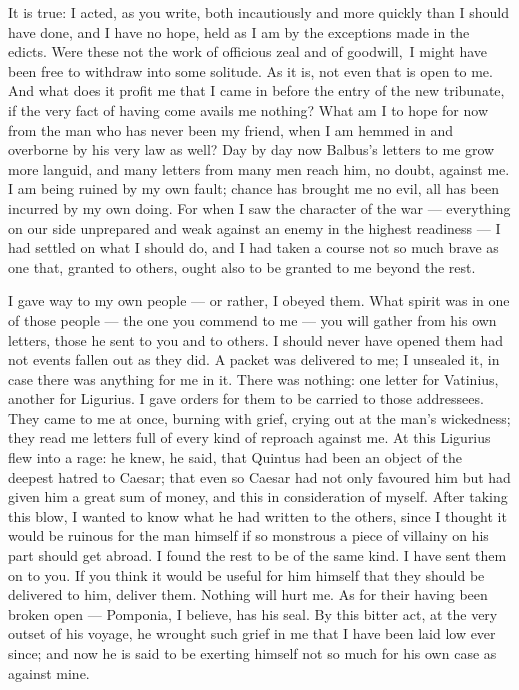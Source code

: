 

 It is true: I acted, as you write, both incautiously and more quickly than I should have done, and I have no hope, held as I am by the exceptions made in the edicts. Were these not the work of officious zeal and \dag of goodwill,\dag\ I might have been free to withdraw into some solitude. As it is, not even that is open to me. And what does it profit me that I came in before the entry of the new tribunate, if the very fact of having come avails me nothing? What am I to hope for now from the man who has never been my friend, when I am hemmed in and overborne by his very law as well? Day by day now Balbus's letters to me grow more languid, and many letters from many men reach him, no doubt, against me. I am being ruined by my own fault; chance has brought me no evil, all has been incurred by my own doing. For when I saw the character of the war --- everything on our side unprepared and weak against an enemy in the highest readiness --- I had settled on what I should do, and I had taken a course not so much brave as one that, granted to others, ought also to be granted to me beyond the rest.

 I gave way to my own people --- or rather, I obeyed them. What spirit was in one of those people --- the one you commend to me --- you will gather from his own letters, those he sent to you and to others. I should never have opened them had not events fallen out as they did. A packet was delivered to me; I unsealed it, in case there was anything for me in it. There was nothing: one letter for Vatinius, another for Ligurius. I gave orders for them to be carried to those addressees. They came to me at once, burning with grief, crying out at the man's wickedness; they read me letters full of every kind of reproach against me. At this Ligurius flew into a rage: he knew, he said, that Quintus had been an object of the deepest hatred to Caesar; that even so Caesar had not only favoured him but had given him a great sum of money, and this in consideration of myself. After taking this blow, I wanted to know what he had written to the others, since I thought it would be ruinous for the man himself if so monstrous a piece of villainy on his part should get abroad. I found the rest to be of the same kind. I have sent them on to you. If you think it would be useful for him himself that they should be delivered to him, deliver them. Nothing will hurt me. As for their having been broken open --- Pomponia, I believe, has his seal. By this bitter act, at the very outset of his voyage, he wrought such grief in me that I have been laid low ever since; and now he is said to be exerting himself not so much for his own case as against mine.

